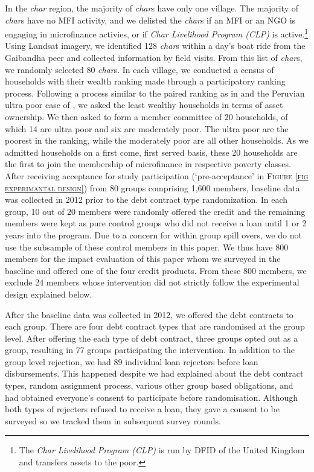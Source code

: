 	In the \textit{char} region, the majority of \textit{char}s have only one village. The majority of \textit{char}s have no MFI activity, and we delisted the \textit{char}s if an MFI or an NGO is engaging in microfinance activies, or if \textit{Char Livelihood Program (CLP)} is active.\footnote{The \textit{Char Livelihood Program (CLP)} is run by DFID of the United Kingdom and transfers assets to the poor. } Using Landsat imagery, we identified 128 \textit{char}s within a day's boat ride from the Gaibandha peer and collected information by field visits. From this list of \textit{char}s, we randomly selected 80 \textit{char}s. In each village, we conducted a census of households with their wealth ranking made through a participatory ranking process. Following a process similar to the paired ranking as in \citet[][p.1212]{Alatas2012} and the Peruvian ultra poor case of \citet[][p.66]{KarlanThuysbaert2019}, we asked the least wealthy households in terms of asset ownership. We then asked to form a member committee of 20 households, of which 14 are ultra poor and six are moderately poor. The ultra poor are the poorest in the ranking, while the moderately poor are all other households. As we admitted households on a first come, first served basis, these 20 households are the first to join the membership of microfinance in respective poverty classes. After receiving acceptance for study participation (`pre-acceptance' in \textsc{\normalsize Figure \ref{fig experimantal design}}) from 80 groups comprising 1,600 members, baseline data was collected in 2012 prior to the debt contract type randomization. In each group, 10 out of 20 members were randomly offered the credit and the remaining members were kept as pure control groups who did not receive a loan until 1 or 2 years into the program. Due to a concern for within group spill overs, we do not use the subsample of these control members in this paper. We thus have 800 members for the impact evaluation of this paper whom we surveyed in the baseline and offered one of the four credit products. From these 800 members, we exclude 24 members whose intervention did not strictly follow the experimental design explained below.
	
	After the baseline data was collected in 2012, we offered the debt contracts to each group. There are four debt contract types that are randomised at the group level. After offering the each type of debt contract, three groups opted out as a group, resulting in 77 groups participating the intervention. In addition to the group level rejection, we had 89 individual loan rejectors before loan disbursements. This happened despite we had explained about the debt contract types, random assignment process, various other group based obligations, and had obtained everyone's consent to participate before randomisation. Although both types of rejecters refused to receive a loan, they gave a consent to be surveyed so we tracked them in subsequent survey rounds.



